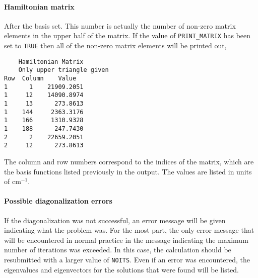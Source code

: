 \documentclass{article}
\newcommand{\wn}{cm$^{-1}$}
\begin{document}
\paragraph{Hamiltonian matrix}
After the basis set. This
number is actually the number of non-zero matrix elements in the upper
half of the matrix. If the value of {\tt PRINT\_MATRIX} has been set to
{\tt TRUE} then all of the non-zero matrix elements will be printed
out,
\begin{verbatim}
	Hamiltonian Matrix
	Only upper triangle given
Row  Column    Value
1      1    21909.2051
1     12    14090.8974
1     13      273.8613
1    144     2363.3176
1    166     1310.9328
1    188      247.7430
2      2    22659.2051
2     12      273.8613
\end{verbatim}
The column and row numbers correspond to the indices of the matrix,
which are the basis functions listed previously in the output. The
values are listed in units of \wn .

\paragraph{Possible diagonalization errors}
If the diagonalization was not successful, an error message will be
given indicating what the problem was. For the most part, the only
error message that will be encountered in normal practice in the
message indicating the maximum number of iterations was exceeded. In
this case, the calculation should be resubmitted with a larger value
of {\tt NOITS}. Even if an error was
encountered, the eigenvalues and eigenvectors for the solutions that
were found will be listed.

\end{document}
